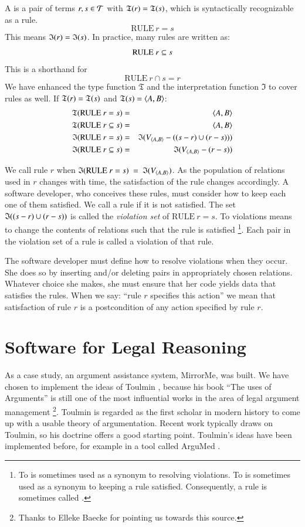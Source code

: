 \documentclass{elsarticle}
\begin{document}
	A  is a pair of terms $r,s\in\mathcal{T}$ with $\mathfrak{T}(r)=\mathfrak{T}(s)$, which is syntactically recognizable as a rule.
\[\text{RULE}\ r = s\]
	This means \(\mathfrak{I}(r) = \mathfrak{I}(s)\). In practice, many rules are written as:
\[\text{RULE}\ r\subseteq s\]
	This is a shorthand for 
\[\text{RULE}\ r\cap s = r\]
	We have enhanced the type function $\mathfrak{T}$ and the interpretation function $\mathfrak{I}$ to cover rules as well.
	If $\mathfrak{T}(r)=\mathfrak{T}(s)$ and $\mathfrak{T}(s)=\langle{A},{B}\rangle$:
\begin{eqnarray}
	\mathfrak{T}(\text{RULE}\ r = s)   &=&\langle{A},{B}\rangle\\
	\mathfrak{T}(\text{RULE}\ r\subseteq s)&=&\langle{A},{B}\rangle\\
	\mathfrak{I}(\text{RULE}\ r = s)   &=&\mathfrak{I}(V_{\langle{A},{B}\rangle}-((s-r)\cup(r-s)))\\
	\mathfrak{I}(\text{RULE}\ r\subseteq s)&=&\mathfrak{I}(V_{\langle{A},{B}\rangle}-(r-s))
\end{eqnarray}

	We call rule $r$  when $\ti{\text{RULE}\ r = s}\ =\ \ti{\fullt{A}{B}}$.
	As the population of relations used in $r$ changes with time, the satisfaction of the rule changes accordingly.
	A software developer, who conceives these rules, must consider how to keep each one of them satisfied.
	We call a rule  if it is not satisfied.
	The set $\mathfrak{I}((s-r)\cup(r-s))$ is called the \emph{violation set} of \(\text{RULE}\ r = s\).
	To  violations means to change the contents of relations such that the rule is satisfied%
\footnote{To  is sometimes used as a synonym to resolving violations.
	To  is sometimes used as a synonym to keeping a rule satisfied.
	Consequently, a rule is sometimes called .}.
	Each pair in the violation set of a rule is called a violation of that rule.

	The software developer must define how to resolve violations when they occur.
	She does so by inserting and/or deleting pairs in appropriately chosen relations.
	Whatever choice she makes, she must ensure that her code yields data that satisfies the rules.
	When we say: ``rule $r$ specifies this action'' we mean that satisfaction of rule $r$ is a postcondition of any action specified by rule $r$. 

\section{Software for Legal Reasoning}
\label{sct:Conceptual analysis}
	As a case study, an argument assistance system, MirrorMe, was built.
	We have chosen to implement the ideas of Toulmin \cite{Toulmin1958},
	because his book ``The uses of Arguments'' is still one of the most influential works in the area of legal argument management%
\footnote{Thanks to Elleke Baecke for pointing us towards this source.}.
	Toulmin is regarded as the first scholar in modern history to come up with a usable theory of argumentation.
	Recent work typically draws on Toulmin, so his doctrine offers a good starting point.
	Toulmin's ideas have been implemented before, for example in a tool called ArguMed \cite{Verheij1999}.
\end{document}
